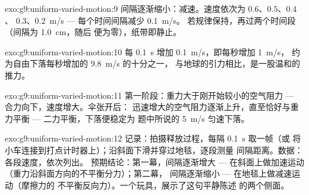 \begin{solution}{exo:g9:uniform-varied-motion:9}
间隔逐渐缩小：减速。速度依次为 $0.6$、$0.5$、$0.4$、
$0.3$、\qty{0.2}{m/s} --- 每个时间间隔减少 \qty{0.1}{m/s}。
若规律保持，再过两个时间段（间隔为 \qty{1.0}{cm}，随后
便为零），纸带即静止。
\end{solution}

\begin{solution}{exo:g9:uniform-varied-motion:10}
每 \qty{0.1}{s} 增加 \qty{0.1}{m/s}，即每秒增加 \qty{1}{m/s}，
约为自由下落每秒增加的 \qty{9.8}{m/s} 的十分之一，
与地球的引力相比，是一股温和的推力。
\end{solution}

\begin{solution}{exo:g9:uniform-varied-motion:11}
第一阶段：重力大于刚开始较小的空气阻力 ---
合力向下，速度增大。伞张开后：
迅速增大的空气阻力逐渐上升，直至恰好与重力平衡
--- 二力平衡，下落便稳定为
题中所说的 \qty{5}{m/s} 匀速下落。
\end{solution}

\begin{solution}{exo:g9:uniform-varied-motion:12}
记录：拍摄释放过程，每隔 \qty{0.1}{s} 取一帧（或
将小车连接到打点计时器上）；沿斜面下滑并穿过地毯，逐段测量
间隔距离。数据：各段速度，依次列出。
预期结论：第一幕，间隔逐渐增大 --- 在斜面上做加速运动
（重力沿斜面方向的不平衡分力）；第二幕，
间隔逐渐缩小 --- 在地毯上做减速运动（摩擦力的
不平衡反向力）。一个玩具，展示了这句平静陈述
的两个侧面。
\end{solution}

